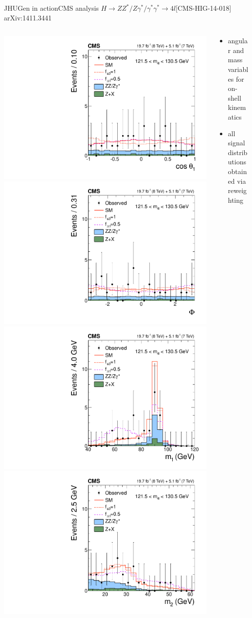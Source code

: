 \documentclass[usenames,dvipsnames,svgnames,table]{beamer}
\begin{document}
\begin{frame}{JHUGen in action}{CMS analysis $H \to ZZ^*/Z\gamma^*/\gamma^*\gamma^* \to 4l$\hfill [CMS-HIG-14-018] arXiv:1411.3441}
\begin{columns}
\begin{column}{0.6\textwidth}
\includegraphics[width=.5\columnwidth]{HVV/costheta1}
\includegraphics[width=.5\columnwidth]{HVV/Phi} \\
\includegraphics[width=.5\columnwidth]{HVV/m1}
\includegraphics[width=.5\columnwidth]{HVV/m2}
\end{column}
\begin{column}{0.4\textwidth}
\begin{itemize}
\item angular and mass variables for on-shell kinematics
\item all signal distributions obtained via reweighting
\end{itemize}
\end{column}
\end{columns}
\end{frame}
\end{document}
